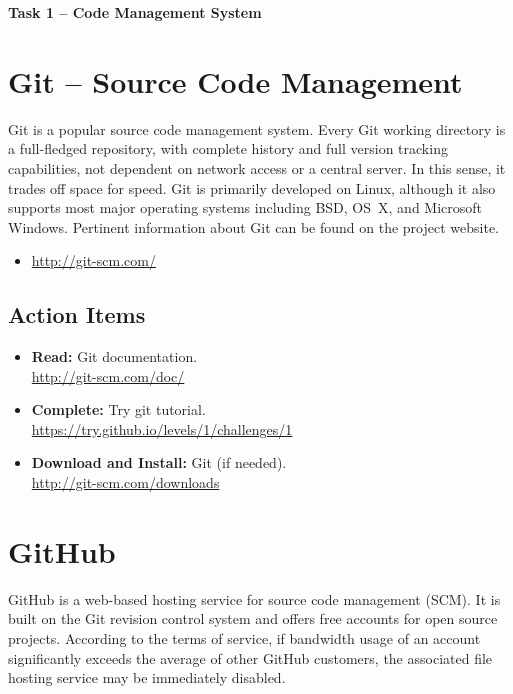 \documentclass[11pt]{article}
\begin{document}
\begin{center}
{\bfseries \LARGE Task 1 -- Code Management System}
\end{center}


\section{Git -- Source Code Management}

Git is a popular source code management system.
Every Git working directory is a full-fledged repository, with complete history and full version tracking capabilities, not dependent on network access or a central server.
In this sense, it trades off space for speed.
Git is primarily developed on Linux, although it also supports most major operating systems including BSD, OS~X, and Microsoft Windows.
Pertinent information about Git can be found on the project website.
\begin{itemize}
\item \url{http://git-scm.com/}
\end{itemize}


\subsection*{Action Items}

\begin{itemize}
\item \textbf{Read:} Git documentation. \\
\url{http://git-scm.com/doc/}
\item \textbf{Complete:} Try git tutorial. \\
\url{https://try.github.io/levels/1/challenges/1}
\item \textbf{Download and Install:} Git (if needed). \\
\url{http://git-scm.com/downloads}
\end{itemize}


\section{GitHub}

GitHub is a web-based hosting service for source code management (SCM).
It is built on the Git revision control system and offers free accounts for open source projects.
According to the terms of service, if bandwidth usage of an account significantly exceeds the average of other GitHub customers, the associated file hosting service may be immediately disabled.
\end{document}
